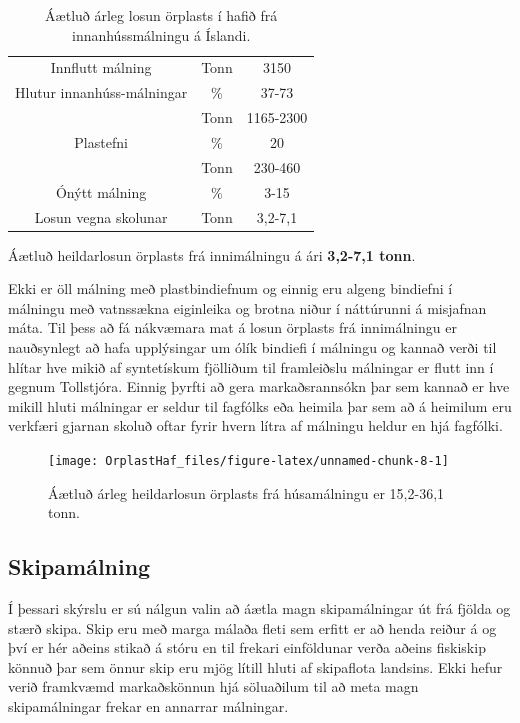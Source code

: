 \documentclass[icelandic,]{book}
\begin{document}
\begin{table}[t]

\caption{\label{tab:innimalningartafla}Áætluð árleg losun örplasts í hafið frá innanhússmálningu á Íslandi.}
\centering
\begin{tabular}{ccc}
\toprule
Innflutt málning & Tonn & 3150\\
Hlutur innanhúss-málningar & \% & 37-73\\
 & Tonn & 1165-2300\\
Plastefni & \% & 20\\
 & Tonn & 230-460\\
\addlinespace
Ónýtt málning & \% & 3-15\\
Losun vegna skolunar & Tonn & 3,2-7,1\\
\bottomrule
\end{tabular}
\end{table}

Áætluð heildarlosun örplasts frá innimálningu á ári \textbf{3,2-7,1 tonn}.

Ekki er öll málning með plastbindiefnum og einnig eru algeng bindiefni í málningu með vatnssækna eiginleika og brotna niður í náttúrunni á misjafnan máta. Til þess að fá nákvæmara mat á losun örplasts frá innimálningu er nauðsynlegt að hafa upplýsingar um ólík bindiefi í málningu og kannað verði til hlítar hve mikið af syntetískum fjölliðum til framleiðslu málningar er flutt inn í gegnum Tollstjóra. Einnig þyrfti að gera markaðsrannsókn þar sem kannað er hve mikill hluti málningar er seldur til fagfólks eða heimila þar sem að á heimilum eru verkfæri gjarnan skoluð oftar fyrir hvern lítra af málningu heldur en hjá fagfólki.

\begin{figure}

{\centering \texttt{[image: OrplastHaf\_files/figure-latex/unnamed-chunk-8-1]} 

}

\caption{Áætluð árleg heildarlosun örplasts frá húsamálningu er 15,2-36,1 tonn.}\label{fig:unnamed-chunk-8}
\end{figure}

\hypertarget{skipamalning}{%
\subsection*{Skipamálning}\label{skipamalning}}

Í þessari skýrslu er sú nálgun valin að áætla magn skipamálningar út frá fjölda og stærð skipa. Skip eru með marga málaða fleti sem erfitt er að henda reiður á og því er hér aðeins stikað á stóru en til frekari einföldunar verða aðeins fiskiskip könnuð þar sem önnur skip eru mjög lítill hluti af skipaflota landsins. Ekki hefur verið framkvæmd markaðskönnun hjá söluaðilum til að meta magn skipamálningar frekar en annarrar málningar.
\end{document}
